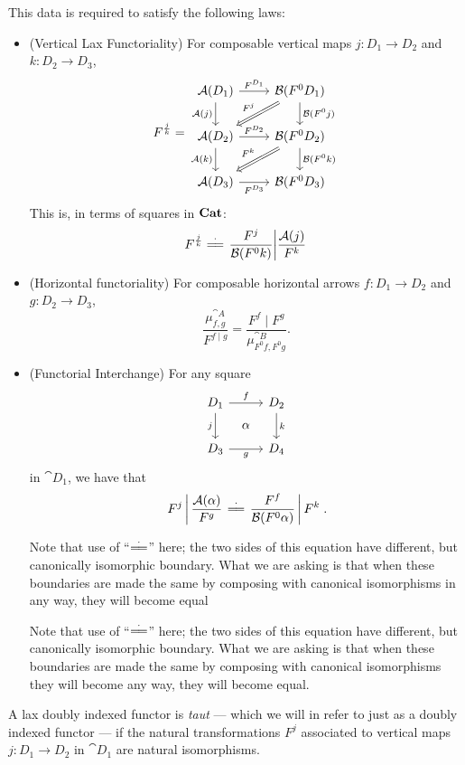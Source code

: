 \documentclass[DynamicalBook]{subfiles}
\begin{document}
\begin{definition}
This data is required to satisfy the following laws:
\begin{itemize}
  \item (Vertical Lax Functoriality) For composable vertical maps $j : D_1 \to D_2$ and $k :
    D_2 \to D_3$, 
\[
F^{\frac{j}{k}} = 
\begin{tikzcd}
  \cat{A}(D_1) \ar[d, "{\cat{A}(j)}"'] \ar[r, "F^{D_1}"] & \cat{B}(F^0D_1)
\ar[dl, Rightarrow, "F^j"']  \ar[d, "\cat{B}(F^0j)"]  \\
\cat{A}(D_2) \ar[d, "{\cat{A}(k)}"']\ar[r,"F^{D_2}"] & \cat{B}(F^0D_2)\ar[d, "\cat{B}(F^0k)"] \ar[dl, Rightarrow, "F^k"'] \\
\cat{A}(D_3) \ar[r,"F^{D_3}"']& \cat{B}(F^0D_3) 
\end{tikzcd}
\]
This is, in terms of squares in $\textbf{Cat}$:
    $$F^{\frac{j}{k}} \coheq \left. \frac{F^j}{\cat{B}(F^0k)} \middle| \frac{\cat{A}(j)}{F^k} \right.$$
  \item (Horizontal functoriality) For composable horizontal arrows $f : D_1 \to
    D_2$ and $g : D_2 \to D_3$, 
$$\frac{\mu^{\cat{A}}_{f, g}}{F^{f \mid g}} = \frac{F^f \mid
  F^g}{\mu^{\cat{B}}_{F^0f, F^0g}}.$$ 
\item (Functorial Interchange) For any square
\[
\begin{tikzcd}[sep=tiny]
D_1 \ar[rr, "f"] \ar[dd, "j"'] & & D_2 \ar[dd, "k"] \\
 & \alpha & \\
D_3 \ar[rr, "g"'] & & D_4
\end{tikzcd}
\]
in $\cat{D}_1$, we have that
\[
  \left. F^j \,\middle|\, \frac{\cat{A}(\alpha)}{F^g} \right. \coheq \left.
    \frac{F^f}{\cat{B}(F^0 \alpha)} \,\middle|\, F^k \right. .
\]

Note that use of ``$\coheq$'' here; the two sides of this equation have
different, but canonically isomorphic boundary. What we are asking is that when these boundaries are made
the same by composing with canonical isomorphisms in any way, they will become
equal

Note that use of ``$\coheq$'' here; the two sides of this equation have
different, but canonically isomorphic boundary. What we are asking is that when these boundaries are made
the same by composing with canonical isomorphisms they will become any way, they
will become equal. 
\end{itemize}

A lax doubly indexed functor is \emph{taut} --- which we will in refer to just
as a doubly indexed functor --- if the natural transformations $F^j$ associated
to vertical maps $j : D_1 \to D_2$ in $\cat{D}_1$ are natural isomorphisms.

\end{definition}
\end{document}
